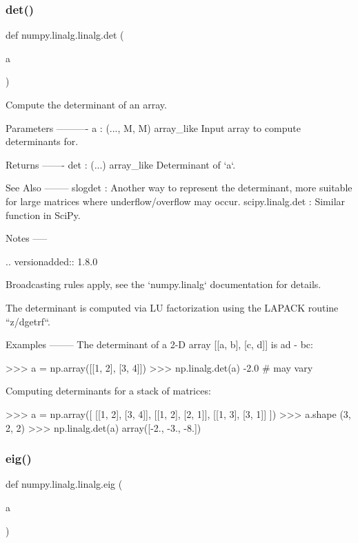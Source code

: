 \subsubsection{\texorpdfstring{det()}{det()}}
{\footnotesize\ttfamily def numpy.\+linalg.\+linalg.\+det (\begin{DoxyParamCaption}\item[{}]{a }\end{DoxyParamCaption})}

\begin{DoxyVerb}Compute the determinant of an array.

Parameters
----------
a : (..., M, M) array_like
    Input array to compute determinants for.

Returns
-------
det : (...) array_like
    Determinant of `a`.

See Also
--------
slogdet : Another way to represent the determinant, more suitable
  for large matrices where underflow/overflow may occur.
scipy.linalg.det : Similar function in SciPy.

Notes
-----

.. versionadded:: 1.8.0

Broadcasting rules apply, see the `numpy.linalg` documentation for
details.

The determinant is computed via LU factorization using the LAPACK
routine ``z/dgetrf``.

Examples
--------
The determinant of a 2-D array [[a, b], [c, d]] is ad - bc:

>>> a = np.array([[1, 2], [3, 4]])
>>> np.linalg.det(a)
-2.0 # may vary

Computing determinants for a stack of matrices:

>>> a = np.array([ [[1, 2], [3, 4]], [[1, 2], [2, 1]], [[1, 3], [3, 1]] ])
>>> a.shape
(3, 2, 2)
>>> np.linalg.det(a)
array([-2., -3., -8.])\end{DoxyVerb}
 \mbox{\label{namespacenumpy_1_1linalg_1_1linalg_a8b3a5a4f2fc6d54fc2baf004f3b3393a}} 
\subsubsection{\texorpdfstring{eig()}{eig()}}
{\footnotesize\ttfamily def numpy.\+linalg.\+linalg.\+eig (\begin{DoxyParamCaption}\item[{}]{a }\end{DoxyParamCaption})}

